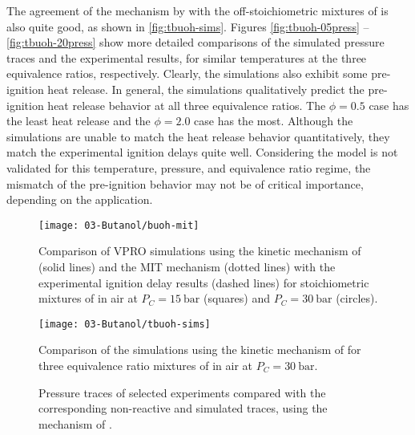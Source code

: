 \documentclass[12pt, letterpaper]{article}
\begin{document}
The agreement of the mechanism by \textcite{Sarathy2012} with the
off-stoichiometric mixtures of \tBuOH{} is also quite good, as shown
in \autoref{fig:tbuoh-sims}. Figures \ref{fig:tbuoh-05press}
-- \ref{fig:tbuoh-20press} show more detailed comparisons
of the simulated pressure traces and the experimental results, for similar
temperatures at the three equivalence ratios, respectively. Clearly, the
simulations also exhibit some pre-ignition heat release. In general, the
simulations qualitatively predict the pre-ignition heat release behavior at all
three equivalence ratios. The $\phi=\num{0.5}$ case has the least heat release and
the $\phi=\num{2.0}$ case has the most. Although the simulations are unable to match
the heat release behavior quantitatively, they match the experimental ignition
delays quite well. Considering the model is not validated for this temperature,
pressure, and equivalence ratio regime, the mismatch of the pre-ignition
behavior may not be of critical importance, depending on the application.

\begin{figure}
    \begin{floatrow}
        \ffigbox
            {\texttt{[image: 03-Butanol/buoh-mit]}}
            {\caption{Comparison of VPRO simulations using the kinetic mechanism of
                \textcite{Sarathy2012} (solid lines) and the MIT mechanism
                \cite{Hansen2013,Merchant2013} (dotted lines) with the experimental
                ignition delay results (dashed lines) for stoichiometric mixtures of
                \iBuOH{} in air at $P_C=\SI{15}{\bar}$ (squares) and $P_C=\SI{30}{\bar}$
                (circles).}
            \label{fig:buoh-mit}}
        \ffigbox
            {\texttt{[image: 03-Butanol/tbuoh-sims]}}
            {\caption{Comparison of the simulations using the kinetic mechanism of
                \textcite{Sarathy2012} for three equivalence ratio mixtures of
                \tBuOH{} in air at $P_C=\SI{30}{\bar}$.}
            \label{fig:tbuoh-sims}}
    \end{floatrow}
\end{figure}

\begin{figure}
    {\caption{Pressure traces of selected
     \tBuOH{} experiments compared with the corresponding
     non-reactive and simulated traces, using the mechanism of
     \textcite{Sarathy2012}.}
    }
\end{figure}
\end{document}
